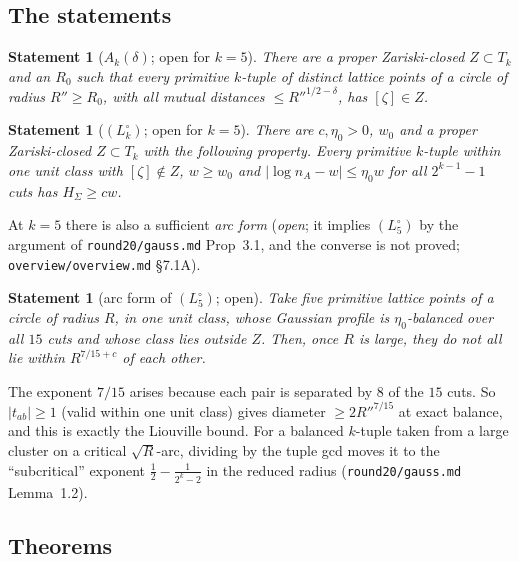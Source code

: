 \documentclass[11pt]{article}
\newtheorem{statement}[theorem]{Statement}
\newcommand{\rec}[1]{\texttt{#1}}
\begin{document}
\subsection{The statements}

\begin{statement}[\(A_k(\delta)\); open for \(k=5\)]\label{st:Ak}
There are a proper Zariski-closed \(Z\subset T_k\) and an \(R_0\) such that
every primitive \(k\)-tuple of distinct lattice points of a circle of radius
\(R''\ge R_0\), with all mutual distances \(\le R''^{1/2-\delta}\), has
\([\zeta]\in Z\).
\end{statement}

\begin{statement}[\((L_k^\circ)\); open for \(k=5\)]\label{st:Lkcirc}
There are \(c,\eta_0>0\), \(w_0\) and a proper Zariski-closed \(Z\subset T_k\)
with the following property.  Every primitive \(k\)-tuple \emph{within one
unit class} with \([\zeta]\notin Z\), \(w\ge w_0\) and
\(|\log n_A-w|\le\eta_0w\) for all \(2^{k-1}-1\) cuts has
\(H_\Sigma\ge cw\).
\end{statement}

At \(k=5\) there is also a sufficient \emph{arc form} (\emph{open}; it implies
\((L_5^\circ)\) by the argument of \rec{round20/gauss.md} Prop~3.1, and the
converse is not proved; \rec{overview/overview.md} \S7.1A).

\begin{statement}[arc form of \((L_5^\circ)\); open]\label{st:arc}
Take five primitive lattice points of a circle of radius \(R\), in one unit
class, whose Gaussian profile is \(\eta_0\)-balanced over all \(15\) cuts and
whose class lies outside \(Z\).  Then, once \(R\) is large, they do not all lie
within \(R^{7/15+c}\) of each other.
\end{statement}

The exponent \(7/15\) arises because each pair is separated by \(8\) of the
\(15\) cuts.  So \(|t_{ab}|\ge1\) (valid within one unit class) gives diameter
\(\ge2R''^{7/15}\) at exact balance, and this is exactly the Liouville bound.
For a balanced \(k\)-tuple taken from a large cluster on a critical
\(\sqrt R\)-arc, dividing by the tuple gcd moves it to the ``subcritical''
exponent \(\frac12-\frac1{2^k-2}\) in the reduced radius
(\rec{round20/gauss.md} Lemma~1.2).

\subsection{Theorems}
\end{document}
